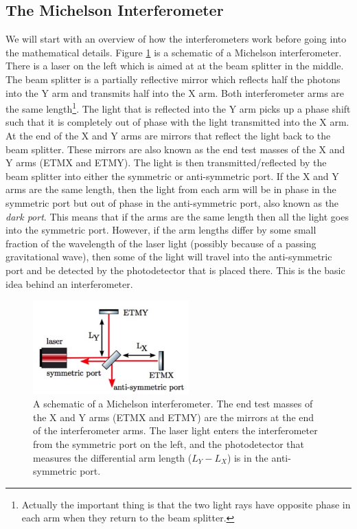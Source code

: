 \documentclass[11pt]{cuthesis}
\begin{document}
\subsection{The Michelson Interferometer} \label{sec:mich}
We will start with an overview of how the interferometers work before going into the mathematical details. Figure \ref{fig:ifo} is a schematic of a Michelson interferometer. There is a laser on the left which is aimed at at the beam splitter in the middle. The beam splitter is a partially reflective mirror which reflects half the photons into the Y arm and transmits half into the X arm. Both interferometer arms are the same length\footnote{Actually the important thing is that the two light rays have opposite phase in each arm when they return to the beam splitter.}. The light that is reflected into the Y arm picks up a phase shift such that it is completely out of phase with the light transmitted into the X arm. At the end of the X and Y arms are mirrors that reflect the light back to the beam splitter. These mirrors are also known as the end test masses of the X and Y arms (ETMX and ETMY). The light is then transmitted/reflected by the beam splitter into either the symmetric or anti-symmetric port. If the X and Y arms are the same length, then the light from each arm will be in phase in the symmetric port but out of phase in the anti-symmetric port, also known as the \emph{dark port}. This means that if the arms are the same length then all the light goes into the symmetric port. However, if the arm lengths differ by some small fraction of the wavelength of the laser light (possibly because of a passing gravitational wave), then some of the light will travel into the anti-symmetric port and be detected by the photodetector that is placed there. This is the basic idea behind an interferometer.

\begin{figure}[ht]
\centering
\includegraphics[width=6cm]{michelson.png} 
\caption{A schematic of a Michelson interferometer. The end test masses of the X and Y arms (ETMX and ETMY) are the mirrors at the end of the interferometer arms. The laser light enters the interferometer from the symmetric port on the left, and the photodetector that measures the differential arm length ($L_Y-L_X$) is in the anti-symmetric port. \cite{ifo_tech} }
\label{fig:ifo}
\end{figure} 
\end{document}
